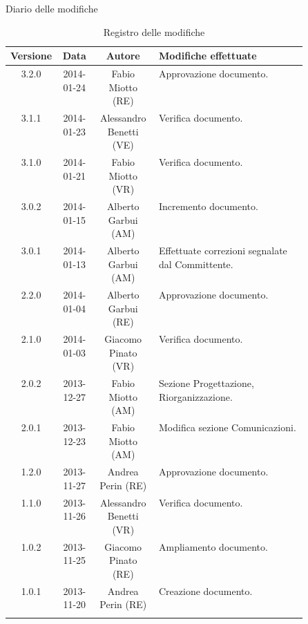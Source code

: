 
\newpage
Diario delle modifiche
\begin{center}
\begin{longtable}{|c|c|c|p{0.5\linewidth}|}
\toprule
\textbf{Versione} & \textbf{Data} & \textbf{Autore} & \textbf{Modifiche effettuate}\\

\midrule
3.2.0 & 2014-01-24 & Fabio Miotto (RE) & Approvazione documento.\\
\midrule
3.1.1 & 2014-01-23 & Alessandro Benetti (VE) & Verifica documento.\\
\midrule
3.1.0 & 2014-01-21  & Fabio Miotto (VR) & Verifica documento.\\
\midrule
3.0.2 & 2014-01-15 	& Alberto Garbui (AM) & Incremento documento.\\
\midrule
3.0.1 & 2014-01-13	& Alberto Garbui (AM) & Effettuate correzioni segnalate dal Committente.\\

\midrule
2.2.0 &	2014-01-04	& Alberto Garbui (RE) & Approvazione documento.\\
\midrule
2.1.0 &	2014-01-03	& Giacomo Pinato (VR) & Verifica documento.\\
\midrule
2.0.2 & 2013-12-27 & Fabio Miotto (AM) & Sezione Progettazione, Riorganizzazione.\\
\midrule
2.0.1 & 2013-12-23 & Fabio Miotto (AM) & Modifica sezione Comunicazioni.\\

\midrule
1.2.0 & 2013-11-27 & Andrea Perin (RE) & Approvazione documento.\\
\midrule
1.1.0 & 2013-11-26 & Alessandro Benetti (VR) & Verifica documento.\\
\midrule
1.0.2 & 2013-11-25 & Giacomo Pinato (RE) & Ampliamento documento.\\
\midrule
1.0.1 & 2013-11-20 & Andrea Perin (RE) & Creazione documento.\\

\bottomrule
\caption{Registro delle modifiche}
\label{tab:changelog}
\end{longtable}
\end{center}

\newpage
\tableofcontents


